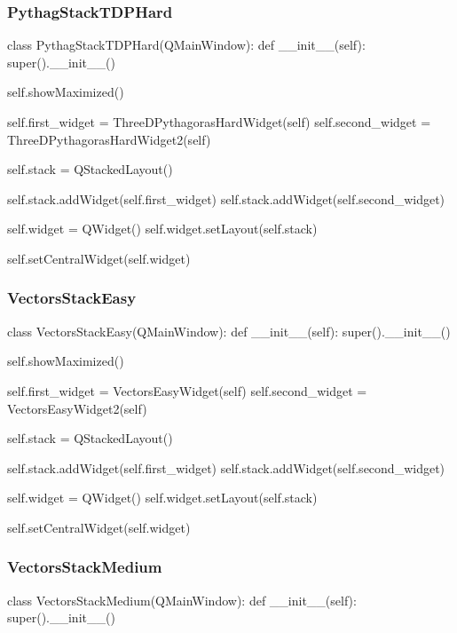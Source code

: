 \begin{landscape}
\subsubsection{PythagStackTDPHard}

\begin{python}
class PythagStackTDPHard(QMainWindow):
    def __init__(self):
        super().__init__()

        self.showMaximized()

        self.first_widget = ThreeDPythagorasHardWidget(self)
        self.second_widget = ThreeDPythagorasHardWidget2(self)

        self.stack = QStackedLayout()

        self.stack.addWidget(self.first_widget)
        self.stack.addWidget(self.second_widget)

        self.widget = QWidget()
        self.widget.setLayout(self.stack)

        self.setCentralWidget(self.widget)
\end{python}

\subsubsection{VectorsStackEasy}

\begin{python}
class VectorsStackEasy(QMainWindow):
    def __init__(self):
        super().__init__()

        self.showMaximized()

        self.first_widget = VectorsEasyWidget(self)
        self.second_widget = VectorsEasyWidget2(self)

        self.stack = QStackedLayout()

        self.stack.addWidget(self.first_widget)
        self.stack.addWidget(self.second_widget)

        self.widget = QWidget()
        self.widget.setLayout(self.stack)

        self.setCentralWidget(self.widget)
\end{python}

\subsubsection{VectorsStackMedium}

\begin{python}
class VectorsStackMedium(QMainWindow):
    def __init__(self):
        super().__init__()


\end{python}
\end{landscape}
